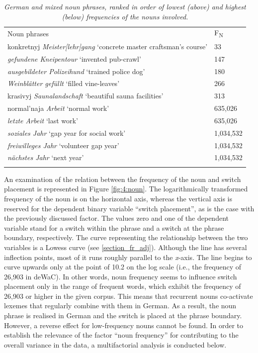 \begin{table}
		{\begin{tabularx}{\textwidth}{XR{1.4cm}} 
			\midrule
			\addlinespace[2mm]
			Noun phrases	& F\textsubscript{N} \\ \addlinespace[2mm] \midrule
			\addlinespace[2mm]
			konkretnyj \textit{Meister[lehr]gang} `concrete master craftsman's course'	&33\\
			\textit{gefundene Kneipentour} `invented pub-crawl'		&147\\
			\textit{ausgebildeter Polizeihund}	`trained police dog'	&180\\
			\textit{Weinblätter gefüllt} `filled vine-leaves'	&266\\
			krasivyj \textit{Saunalandschaft} `beautiful sauna facilities'	&313 \\
			\addlinespace[2mm]
			\midrule
			\addlinespace[2mm]
			normal'naja \textit{Arbeit} `normal work'		&635,026\\
			\textit{letzte Arbeit} `last work'	&635,026\\
			\textit{soziales Jahr} `gap year for social work'	&1,034,532\\
			\textit{freiwilleges Jahr} `volunteer gap year'	&1,034,532\\
			\textit{nächstes Jahr} `next year'	&1,034,532\\
			\addlinespace[2mm]
			\midrule 
		\end{tabularx}}
\caption{\textit{German and mixed noun phrases, ranked in order of lowest (above) and highest (below) frequencies of the nouns involved.}} \label{tab:4:6}
\end{table}

An examination of the relation between the frequency of the noun and switch placement is represented in Figure \ref{fig:4:noun}. The logarithmically transformed frequency of the noun is on the horizontal axis, whereas the vertical axis is reserved for the dependent binary variable “switch placement”, as is the case with the previously discussed factor. The values zero and one of the dependent variable stand for a switch within the phrase and a switch at the phrase boundary, respectively. The curve representing the relationship between the two variables is a Lowess curve (see \ref{section_fr_adj}). Although the line has several inflection points, most of it runs roughly parallel to the \textit{x}-axis. The line begins to curve upwards only at the point of 10.2 on the log scale (i.e., the frequency of 26,903 in deWaC). In other words, noun frequency seems to influence switch placement only in the range of frequent words, which exhibit the frequency of 26,903 or higher in the given corpus. This means that recurrent nouns co-activate lexemes that regularly combine with them in German. As a result, the noun phrase is realised in German and the switch is placed at the phrase boundary. However, a reverse effect for low-frequency nouns cannot be found. In order to establish the relevance of the factor “noun frequency” for contributing to the overall variance in the data, a  multifactorial analysis is conducted below.

